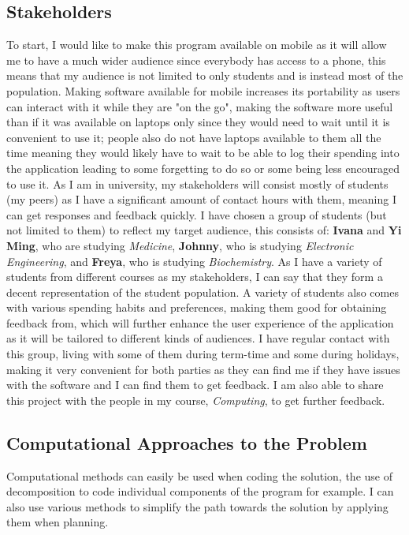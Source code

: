 \documentclass{article}
\begin{document}
\subsection{Stakeholders}
To start, I would like to make this program available on mobile as it will allow me to have a much wider audience since everybody has access to a phone, this means that my audience is not limited to only students and is instead most of the population. Making software available for mobile increases its portability as users can interact with it while they are "on the go", making the software more useful than if it was available on laptops only since they would need to wait until it is convenient to use it; people also do not have laptops available to them all the time meaning they would likely have to wait to be able to log their spending into the application leading to some forgetting to do so or some being less encouraged to use it. 
As I am in university, my stakeholders will consist mostly of students (my peers) as I have a significant amount of contact hours with them, meaning I can get responses and feedback quickly. \newline
I have chosen a group of students (but not limited to them) to reflect my target audience, this consists of: \textbf{Ivana} and \textbf{Yi Ming}, who are studying \textit{Medicine}, \textbf{Johnny}, who is studying \textit{Electronic Engineering}, and \textbf{Freya}, who is studying \textit{Biochemistry}. As I have a variety of students from different courses as my stakeholders, I can say that they form a decent representation of the student population. A variety of students also comes with various spending habits and preferences, making them good for obtaining feedback from, which will further enhance the user experience of the application as it will be tailored to different kinds of audiences. \newline
I have regular contact with this group, living with some of them during term-time and some during holidays, making it very convenient for both parties as they can find me if they have issues with the software and I can find them to get feedback. I am also able to share this project with the people in my course, \textit{Computing}, to get further feedback.

\subsection{Computational Approaches to the Problem}
Computational methods can easily be used when coding the solution, the use of decomposition to code individual components of the program for example. I can also use various methods to simplify the path towards the solution by applying them when planning.
\end{document}
